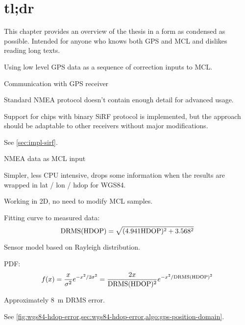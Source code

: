 \chapter{tl;dr}
This chapter provides an overview of the thesis in a form as condensed as possible.
Intended for anyone who knows both GPS and MCL and dislikes reading long texts.

\begin{compactitem}
\item
Using low level GPS data as a sequence of correction inputs to MCL.

\item
Communication with GPS receiver
\begin{compactitem}
    \item Standard NMEA protocol doesn't contain enough detail for advanced usage.
    \item Support for \sirf chips with binary SiRF protocol is implemented, but the
    approach should be adaptable to other receivers without major modifications.
    \item See \cref{sec:impl-sirf}.
\end{compactitem}

\item
NMEA data as MCL input
\begin{compactitem}
    \item Simpler, less CPU intensive, drops some information when the results are
    wrapped in lat / lon / hdop for WGS84.
    \item Working in 2D, no need to modify MCL samples.
    \item
        Fitting curve to measured data:
        \begin{equation*}
            \mathrm{DRMS}(\mathrm{HDOP}) = \sqrt{(\num{4.941}\mathrm{HDOP})^2 + \num{3.568}^2}
        \end{equation*}
    \item Sensor model based on Rayleigh distribution.
    \item PDF:
        \begin{equation*}
            f(x) = \frac{x}{\sigma^2}e^{-x^2/2\sigma^2} =
            \frac{2x}{\mathrm{DRMS}(\mathrm{HDOP})^2}e^{-x^2/\mathrm{DRMS}(\mathrm{HDOP})^2}
        \end{equation*}
    \item Approximately \SI{8}{\meter} DRMS error.
    \item See \cref{fig:wgs84-hdop-error,sec:wgs84-hdop-error,algo:gps-position-domain}.
\end{compactitem}


\end{compactitem}
